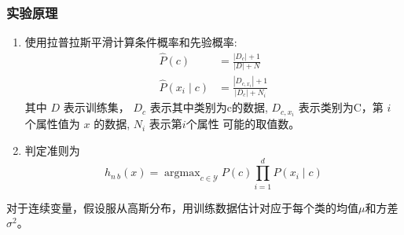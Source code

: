 \documentclass{ctexart}
\begin{document}
\subsubsection{\hei 实验原理}
\begin{enumerate}
    \item 使用拉普拉斯平滑计算条件概率和先验概率:
          \begin{equation}
              \begin{aligned}
                  \hat{P}(c)                       & =\frac{\left|D_{c}\right|+1}{|D|+N}                           \\
                  \hat{P}\left(x_{i} \mid c\right) & =\frac{\left|D_{c, x_{i}}\right|+1}{\left|D_{c}\right|+N_{i}}
              \end{aligned}
          \end{equation}
          其中 $D$ 表示训练集， $D_{c}$ 表示其中类别为c的数据, $D_{c, x_{i}}$ 表示类别为C，第 $i$ 个属性值为 $x$ 的数据, $N_{i}$ 表示第$i$个属性 可能的取值数。
    \item 判定准则为
          $$
              h_{n\ b}(x)=\operatorname{argmax}_{c \in \mathcal{Y}} P(c) \prod_{i=1}^{d} P\left(x_{i} \mid c\right)
          $$
\end{enumerate}
对于连续变量，假设服从高斯分布，用训练数据估计对应于每个类的均值$\mu$和方差$\sigma^{2}$。
\end{document}
